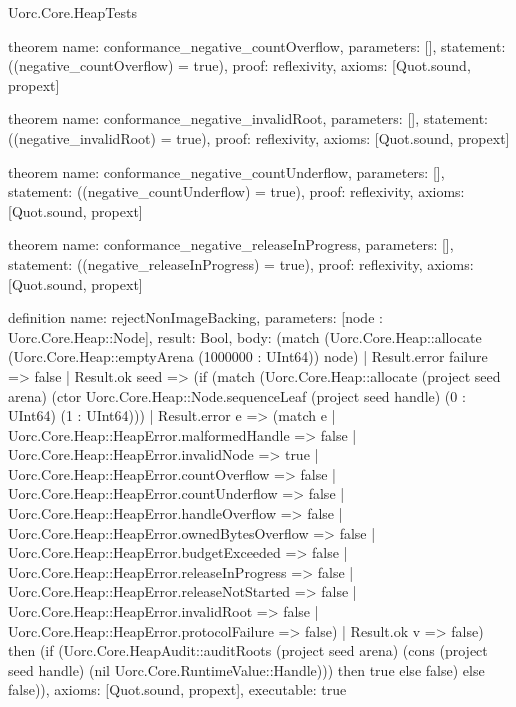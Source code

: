 \begin{lexlean}{Uorc.Core.HeapTests}
\begin{semanticmodule}
theorem{
  name: conformance_negative_countOverflow,
  parameters: [],
  statement: ((negative_countOverflow) = true),
  proof: reflexivity{},
  axioms: [Quot.sound, propext]
}

theorem{
  name: conformance_negative_invalidRoot,
  parameters: [],
  statement: ((negative_invalidRoot) = true),
  proof: reflexivity{},
  axioms: [Quot.sound, propext]
}

theorem{
  name: conformance_negative_countUnderflow,
  parameters: [],
  statement: ((negative_countUnderflow) = true),
  proof: reflexivity{},
  axioms: [Quot.sound, propext]
}

theorem{
  name: conformance_negative_releaseInProgress,
  parameters: [],
  statement: ((negative_releaseInProgress) = true),
  proof: reflexivity{},
  axioms: [Quot.sound, propext]
}

definition{
  name: rejectNonImageBacking,
  parameters: [node : Uorc.Core.Heap::Node],
  result: Bool,
  body: (match (Uorc.Core.Heap::allocate (Uorc.Core.Heap::emptyArena (1000000 : UInt64)) node)
    | Result.error failure => false
    | Result.ok seed => (if (match (Uorc.Core.Heap::allocate (project seed arena) (ctor Uorc.Core.Heap::Node.sequenceLeaf (project seed handle) (0 : UInt64) (1 : UInt64)))
      | Result.error e => (match e
        | Uorc.Core.Heap::HeapError.malformedHandle => false
        | Uorc.Core.Heap::HeapError.invalidNode => true
        | Uorc.Core.Heap::HeapError.countOverflow => false
        | Uorc.Core.Heap::HeapError.countUnderflow => false
        | Uorc.Core.Heap::HeapError.handleOverflow => false
        | Uorc.Core.Heap::HeapError.ownedBytesOverflow => false
        | Uorc.Core.Heap::HeapError.budgetExceeded => false
        | Uorc.Core.Heap::HeapError.releaseInProgress => false
        | Uorc.Core.Heap::HeapError.releaseNotStarted => false
        | Uorc.Core.Heap::HeapError.invalidRoot => false
        | Uorc.Core.Heap::HeapError.protocolFailure => false)
      | Result.ok v => false) then (if (Uorc.Core.HeapAudit::auditRoots (project seed arena) (cons (project seed handle) (nil Uorc.Core.RuntimeValue::Handle))) then true else false) else false)),
  axioms: [Quot.sound, propext],
  executable: true
}


\end{semanticmodule}
\end{lexlean}
